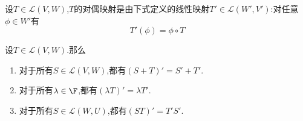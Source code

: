 \documentclass{ctexart}
\begin{document}
\begin{definition}[1.7 对偶映射]
    设$T\in\mathcal{L}(V,W)$,$T$的对偶映射是由下式定义的线性映射$T'\in\mathcal{L}(W',V')$:对任意$\phi\in W'$有
    $$T'(\phi)=\phi\circ T$$
\end{definition}
\begin{formal}[1.8 对偶映射的代数性质]
    设$T\in\mathcal{L}(V,W)$.那么
    \begin{enumerate}[label=\tbf{(\arabic*)}]
        \item 对于所有$S\in\mathcal{L}(V,W)$,都有$(S+T)'=S'+T'$.
        \item 对于所有$\lambda\in\F$,都有$(\lambda T)'=\lambda T'$.
        \item 对于所有$S\in\mathcal{L}(W,U)$,都有$(ST)'=T'S'$.
    \end{enumerate}
\end{formal}
\end{document}

